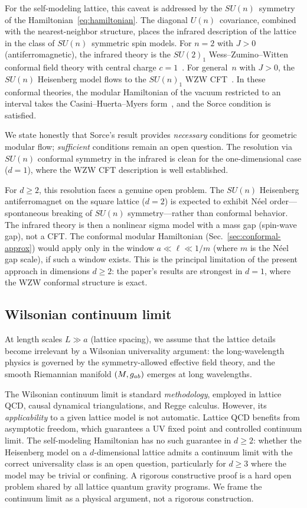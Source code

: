 For the self-modeling lattice, this caveat is addressed by the
$SU(n)$~symmetry of the Hamiltonian~\eqref{eq:hamiltonian}.  The
diagonal $U(n)$~covariance, combined with the nearest-neighbor
structure, places the infrared description of the lattice in the class
of $SU(n)$~symmetric spin models.  For $n = 2$ with $J > 0$
(antiferromagnetic), the infrared theory is the $SU(2)_1$
Wess--Zumino--Witten conformal field theory with central charge
$c = 1$~\cite{Affleck1986, AffleckHaldane1987}.  For general~$n$ with
$J > 0$, the $SU(n)$ Heisenberg model flows to the $SU(n)_1$ WZW
CFT~\cite{Affleck1986b}.  In these conformal theories, the modular
Hamiltonian of the vacuum restricted to an interval takes the
Casini--Huerta--Myers form~\cite{CasiniHuertaMyers2011}, and the
Sorce condition is satisfied.

We state honestly that Sorce's result provides \emph{necessary}
conditions for geometric modular flow; \emph{sufficient} conditions
remain an open question.  The resolution via $SU(n)$ conformal
symmetry in the infrared is clean for the one-dimensional case
($d = 1$), where the WZW CFT description is well established.

For $d \geq 2$, this resolution faces a genuine open problem.  The
$SU(n)$ Heisenberg antiferromagnet on the square lattice ($d = 2$) is
expected to exhibit N\'eel order---spontaneous breaking of $SU(n)$
symmetry---rather than conformal behavior.  The infrared theory is
then a nonlinear sigma model with a mass gap (spin-wave gap), not a
CFT.  The conformal modular Hamiltonian
(Sec.~\ref{sec:conformal-approx}) would apply only in the window
$a \ll \ell \ll 1/m$ (where $m$ is the N\'eel gap scale), if such a
window exists.  This is the principal limitation of the present
approach in dimensions $d \geq 2$: the paper's results are strongest
in $d = 1$, where the WZW conformal structure is exact.

\subsection{Wilsonian continuum limit}
\label{sec:continuum}

At length scales $L \gg a$ (lattice spacing), we assume that the
lattice details become irrelevant by a Wilsonian universality
argument: the long-wavelength physics is governed by the
symmetry-allowed effective field theory, and the smooth Riemannian
manifold $(M, g_{ab})$ emerges at long wavelengths.

The Wilsonian continuum limit is standard \emph{methodology}, employed
in lattice QCD, causal dynamical triangulations, and Regge calculus.
However, its \emph{applicability} to a given lattice model is not
automatic.  Lattice QCD benefits from asymptotic freedom, which
guarantees a UV fixed point and controlled continuum limit.  The
self-modeling Hamiltonian has no such guarantee in $d \geq 2$: whether
the Heisenberg model on a $d$-dimensional lattice admits a continuum
limit with the correct universality class is an open question,
particularly for $d \geq 3$ where the model may be trivial or
confining.  A rigorous constructive proof is a hard open problem shared
by all lattice quantum gravity programs.  We frame the continuum limit
as a physical argument, not a rigorous construction.

